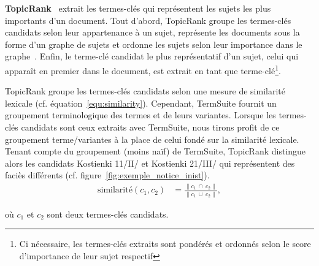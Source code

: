     \textbf{TopicRank}~\cite{bougouin2013topicrank} extrait les termes-clés qui
    représentent les sujets les plus importants d'un document. Tout d'abord,
    TopicRank groupe les termes-clés candidats selon leur appartenance à un
    sujet, représente les documents sous la forme d'un graphe de sujets et
    ordonne les sujets selon leur importance dans le
    graphe~\cite{mihalcea2004textrank}. Enfin, le terme-clé candidat le plus
    représentatif d'un sujet, celui qui apparaît en premier dans le document,
    est extrait en tant que terme-clé\footnote{Ci nécessaire, les termes-clés
    extraits sont pondérés et ordonnés selon le score d'importance de leur sujet
    respectif}.
    
    TopicRank groupe les termes-clés candidats selon une mesure de similarité
    lexicale (cf. équation~\ref{equ:similarity}). Cependant, TermSuite fournit
    un groupement terminologique des termes et de leurs variantes. Lorsque les
    termes-clés candidats sont ceux extraits avec TermSuite, nous tirons profit
    de ce groupement terme/variantes à la place de celui fondé sur la similarité
    lexicale. Tenant compte du groupement (moins naïf) de TermSuite, TopicRank
    distingue alors les candidats \og{}Kostienki 11/II/\fg{} et \og{}Kostienki
    21/III/\fg{} qui représentent des faciès différents (cf.
    figure~\ref{fig:exemple_notice_inist}).
    \begin{align}
      \text{similarité}(c_1, c_2) &= \frac{\|c_1~\cap~c_2\|}{\|c_1~\cup~c_2\|}, \label{equ:similarity}
    \end{align}
    \begin{center}
      où $c_1$ et $c_2$ sont deux termes-clés candidats.
    \end{center}

